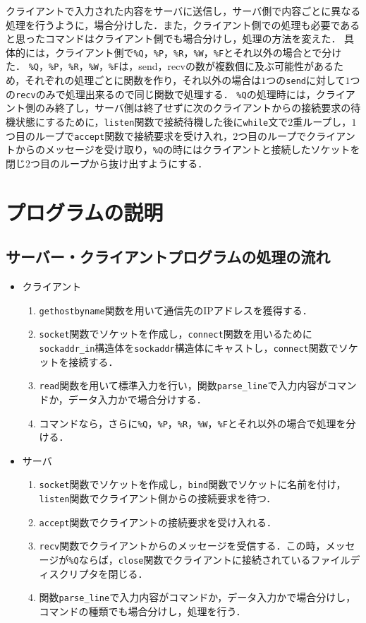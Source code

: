 \documentclass{jarticle}[11pt]
\begin{document}
クライアントで入力された内容をサーバに送信し，サーバ側で内容ごとに異なる処理を行うように，場合分けした．また，クライアント側での処理も必要であると思ったコマンドはクライアント側でも場合分けし，処理の方法を変えた．
具体的には，クライアント側で\verb|%Q|，\verb|%P|，\verb|%R|，\verb|%W|，\verb|%F|とそれ以外の場合とで分けた．
\verb|%Q|，\verb|%P|，\verb|%R|，\verb|%W|，\verb|%F|は，send，recvの数が複数個に及ぶ可能性があるため，それぞれの処理ごとに関数を作り，それ以外の場合は$1$つの\verb|send|に対して$1$つの\verb|recv|のみで処理出来るので同じ関数で処理する．
\verb|%Q|の処理時には，クライアント側のみ終了し，サーバ側は終了せずに次のクライアントからの接続要求の待機状態にするために，\verb|listen|関数で接続待機した後に\verb|while|文で$2$重ループし，$1$つ目のループで\verb|accept|関数で接続要求を受け入れ，$2$つ目のループでクライアントからのメッセージを受け取り，\verb|%Q|の時にはクライアントと接続したソケットを閉じ$2$つ目のループから抜け出すようにする．

    \section{プログラムの説明}
\subsection{サーバー・クライアントプログラムの処理の流れ}
\begin{itemize}
\item クライアント 
  \begin{enumerate}  \item \verb|gethostbyname|関数を用いて通信先のIPアドレスを獲得する．
  \item \verb|socket|関数でソケットを作成し，\verb|connect|関数を用いるために\verb|sockaddr_in|構造体を\verb|sockaddr|構造体にキャストし，\verb|connect|関数でソケットを接続する．
  \item \verb|read|関数を用いて標準入力を行い，関数\verb|parse_line|で入力内容がコマンドか，データ入力かで場合分けする．
  \item コマンドなら，さらに\verb|%Q|，\verb|%P|，\verb|%R|，\verb|%W|，\verb|%F|とそれ以外の場合で処理を分ける．
  \end{enumerate}

\item サーバ
  \begin{enumerate}
  \item \verb|socket|関数でソケットを作成し，\verb|bind|関数でソケットに名前を付け，\verb|listen|関数でクライアント側からの接続要求を待つ．
  \item \verb|accept|関数でクライアントの接続要求を受け入れる．
  \item \verb|recv|関数でクライアントからのメッセージを受信する．この時，メッセージが\verb|%Q|ならば，\verb|close|関数でクライアントに接続されているファイルディスクリプタを閉じる．
  \item 関数\verb|parse_line|で入力内容がコマンドか，データ入力かで場合分けし，コマンドの種類でも場合分けし，処理を行う．
  \end{enumerate}
\end{itemize}
\end{document}
